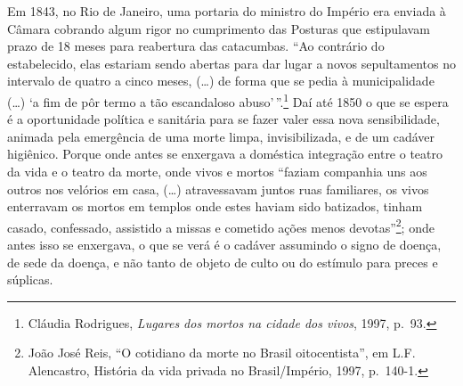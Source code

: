 Em 1843, no Rio de Janeiro, uma portaria do ministro do Império era
enviada à Câmara cobrando algum rigor no cumprimento das Posturas que
estipulavam prazo de 18 meses para reabertura das catacumbas. ``Ao
contrário do estabelecido, elas estariam sendo abertas para dar lugar a
novos sepultamentos no intervalo de quatro a cinco meses, (\ldots{}) de
forma que se pedia à municipalidade (\ldots{}) `a fim de pôr termo a tão
escandaloso abuso'\,''.\footnote{Cláudia Rodrigues, \emph{Lugares dos
  mortos na cidade dos vivos}, 1997, p.~93.} Daí até 1850 o que se
espera é a oportunidade política e sanitária para se fazer valer essa
nova sensibilidade, animada pela emergência de uma morte limpa,
invisibilizada, e de um cadáver higiênico. Porque onde antes se
enxergava a doméstica integração entre o teatro da vida e o teatro da
morte, onde vivos e mortos ``faziam companhia uns aos outros nos
velórios em casa, (\ldots{}) atravessavam juntos ruas familiares, os
vivos enterravam os mortos em templos onde estes haviam sido batizados,
tinham casado, confessado, assistido a missas e cometido ações menos
devotas''\footnote{João José Reis, ``O cotidiano da morte no Brasil
  oitocentista'', em L.F. Alencastro, História da vida privada no
  Brasil/Império, 1997, p.~140-1.}; onde antes isso se enxergava, o que
se verá é o cadáver assumindo o signo de doença, de sede da doença, e
não tanto de objeto de culto ou do estímulo para preces e súplicas.


